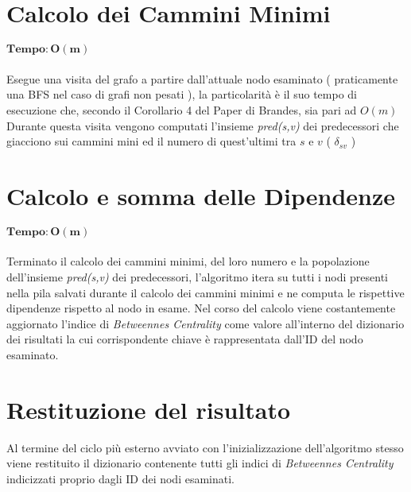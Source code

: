\section{Calcolo dei Cammini Minimi}
$\mathbf{Tempo: O(m)}$\\ 	\\
Esegue una visita del grafo a partire dall'attuale nodo esaminato ( praticamente una BFS nel caso di grafi non pesati ), la particolarità è il suo tempo di esecuzione che, secondo il Corollario 4 del Paper di Brandes, sia pari ad $O(m)$
Durante questa visita vengono computati l'insieme \emph{pred(s,v)} dei predecessori che giacciono sui cammini mini ed il numero di quest'ultimi tra $s$ e $v$ ( $\delta_{sv}$ )

\section{Calcolo e somma delle Dipendenze}
$\mathbf{Tempo: O(m)}$\\ 	\\
Terminato il calcolo dei cammini minimi, del loro numero e la popolazione dell'insieme \emph{pred(s,v)} dei predecessori,  l'algoritmo itera su tutti i nodi presenti nella pila salvati durante il calcolo dei cammini minimi e ne computa le rispettive dipendenze rispetto al nodo in esame. Nel corso del calcolo viene costantemente aggiornato l'indice di \emph{Betweennes Centrality} come valore all'interno del dizionario dei risultati la cui corrispondente chiave è rappresentata dall'ID del nodo esaminato.

\section{Restituzione del risultato}
Al termine del ciclo più esterno avviato con l'inizializzazione dell'algoritmo stesso viene restituito il dizionario contenente tutti gli indici di \emph{Betweennes Centrality} indicizzati proprio dagli ID dei nodi esaminati.

